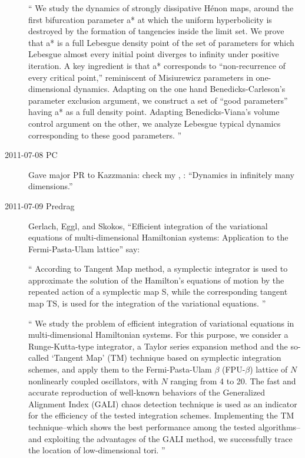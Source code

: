 \begin{description}
``
We study the dynamics of strongly dissipative H\'enon maps, around the
first bifurcation parameter a* at which the uniform hyperbolicity is
destroyed by the formation of tangencies inside the limit set. We prove
that a* is a full Lebesgue density point of the set of parameters for
which Lebesgue almost every initial point diverges to infinity under
positive iteration. A key ingredient is that a* corresponds to
``non-recurrence of every critical point,'' reminiscent of Misiurewicz
parameters in one-dimensional dynamics. Adapting on the one hand
Benedicks-Carleson's parameter exclusion argument, we construct a set
of ``good parameters'' having a* as a full density point. Adapting
Benedicks-Viana's volume control argument on the other, we analyze
Lebesgue typical dynamics corresponding to these good parameters.
''

\item[2011-07-08 PC]                                        \toCB
Gave major PR to Kazzmania: check my
,
: ``Dynamics in infinitely many dimensions.''


\item[2011-07-09 Predrag]
Gerlach, Eggl, and {Skokos},
``Efficient integration of the variational equations of
    multi-dimensional {Hamiltonian} systems: {Application} to the
    {Fermi-Pasta-Ulam} lattice'' say:

``
According to Tangent Map method, a symplectic integrator is used to
approximate the solution of the Hamilton's equations of motion by the
repeated action of a symplectic map S, while the corresponding tangent
map TS, is used for the integration of the variational equations.
''

``
We study the problem of efficient integration of variational equations in
multi-dimensional Hamiltonian systems. For this purpose, we consider a
Runge-Kutta-type integrator, a Taylor series expansion method and the
so-called `Tangent Map' (TM) technique based on symplectic integration
schemes, and apply them to the Fermi-Pasta-Ulam $\beta$ (FPU-$\beta$)
lattice of $N$ nonlinearly coupled oscillators, with $N$ ranging from 4
to 20. The fast and accurate reproduction of well-known behaviors of the
Generalized Alignment Index (GALI) chaos detection technique is used as
an indicator for the efficiency of the tested integration schemes.
Implementing the TM technique--which shows the best performance among the
tested algorithms--and exploiting the advantages of the GALI method, we
successfully trace the location of low-dimensional tori.
''


\end{description}
